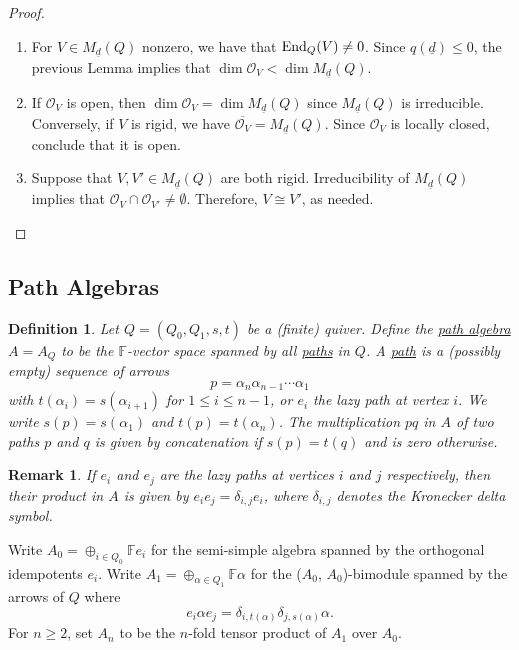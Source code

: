 \documentclass{book}
\newtheorem{definition}[theorem]{Definition}
\newtheorem{remark}[theorem]{Remark}
\begin{document}
\begin{proof}
\begin{enumerate}
\item For $V\in M_{\underline{d}}(Q)$ nonzero, we have that $\textnormal{End}_Q(V)\neq 0$. Since $q(\underline{d})\leq 0$, the previous Lemma implies that $\dim \mathcal{O}_V< \dim M_{\underline{d}}(Q)$.

\item If $\mathcal{O}_V$ is open, then $\dim \mathcal{O}_V= \dim M_{\underline{d}}(Q)$ since $M_{\underline{d}}(Q)$ is irreducible. Conversely, if $V$ is rigid, we have $\overline{\mathcal{O}_V}= M_{\underline{d}}(Q)$. Since $\mathcal{O}_V$ is locally closed, conclude that it is open.

\item Suppose that $V,V'\in M_{\underline{d}}(Q)$ are both rigid. Irreducibility of $M_{\underline{d}}(Q)$ implies that $\mathcal{O}_V\cap \mathcal{O}_{V'}\neq \emptyset$. Therefore, $V\cong V'$, as needed.
\end{enumerate}
\end{proof}

\subsection{Path Algebras}

\begin{definition}
Let $Q=(Q_0,Q_1,s,t)$ be a (finite) quiver. Define the \underline{path algebra} $A=A_Q$ to be the $\mathbb{F}$-vector space spanned by all \underline{paths} in $Q$. A \underline{path} is a (possibly empty) sequence of arrows
$$
p=\alpha_n\alpha_{n-1}\cdots \alpha_1
$$
with $t(\alpha_i)=s(\alpha_{i+1})$ for $1\leq i \leq n-1$, or $e_i$ the lazy path at vertex $i$. We write $s(p)=s(\alpha_1)$ and $t(p)=t(\alpha_n)$. The multiplication $pq$ in $A$ of two paths $p$ and $q$ is given by concatenation if $s(p)=t(q)$ and is zero otherwise.
\end{definition}

\begin{remark}
If $e_i$ and $e_j$ are the lazy paths at vertices $i$ and $j$ respectively, then their product in $A$ is given by $e_ie_j=\delta_{i,j}e_i$, where $\delta_{i,j}$ denotes the Kronecker delta symbol.
\end{remark}

Write $A_0=\oplus_{i\in Q_0}\mathbb{F}e_i$ for the semi-simple algebra spanned by the orthogonal idempotents $e_i$. Write $A_1=\oplus_{\alpha\in Q_1}\mathbb{F}\alpha$ for the ($A_0$, $A_0$)-bimodule spanned by the arrows of $Q$ where
$$
e_i\alpha e_j= \delta_{i,t(\alpha)}\delta_{j,s(\alpha)}\alpha.
$$
For $n\geq 2$, set $A_n$ to be the $n$-fold tensor product of $A_1$ over $A_0$.
\end{document}
